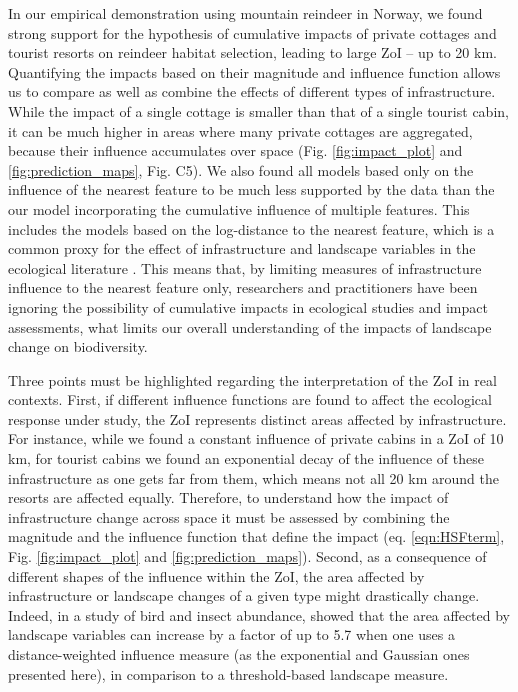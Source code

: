 \documentclass[titlepage]{article}
\begin{document}
In our empirical demonstration using mountain reindeer in Norway, we found strong support for the hypothesis of cumulative impacts of private cottages and tourist resorts on reindeer habitat selection, leading to large ZoI -- up to 20 km. Quantifying the impacts based on their magnitude and influence function allows us to compare as well as combine the effects of different types of infrastructure. While the impact of a single cottage is smaller than that of a single tourist cabin, it can be much higher in areas where many private cottages are aggregated, because their influence accumulates over space (Fig. \ref{fig:impact_plot} and \ref{fig:prediction_maps}, Fig. C5). We also found all models based only on the influence of the nearest feature to be much less supported by the data than the our model incorporating the cumulative influence of multiple features. This includes the models based on the log-distance to the nearest feature, which is a common proxy for the effect of infrastructure and landscape variables in the ecological literature \citep[e.g.][]{torres_assessing_2016,polfus_identifying_2011}. This means that, by limiting measures of infrastructure influence to the nearest feature only, researchers and practitioners have been ignoring the possibility of cumulative impacts in ecological studies and impact assessments, what limits our overall understanding of the impacts of landscape change on biodiversity.

Three points must be highlighted regarding the interpretation of the ZoI in real contexts.
First, if different influence functions are found to affect the ecological response under study, the ZoI represents distinct areas affected by infrastructure. For instance, while we found a constant influence of private cabins in a ZoI of 10 km, for tourist cabins we found an exponential decay of the influence of these infrastructure as one gets far from them, which means not all 20 km around the resorts are affected equally. Therefore, to understand how the impact of infrastructure change across space it must be assessed by combining the magnitude and the influence function that define the impact (eq. \ref{eqn:HSFterm}, Fig. \ref{fig:impact_plot} and \ref{fig:prediction_maps}). Second, as a consequence of different shapes of the influence within the ZoI, the area affected by infrastructure or landscape changes of a given type might drastically change. Indeed, in a study of bird and insect abundance, \citet{miguet_how_2017} showed that the area affected by landscape variables can increase by a factor of up to 5.7 when one uses a distance-weighted influence measure (as the exponential and Gaussian ones presented here), in comparison to a threshold-based landscape measure. 
\end{document}
